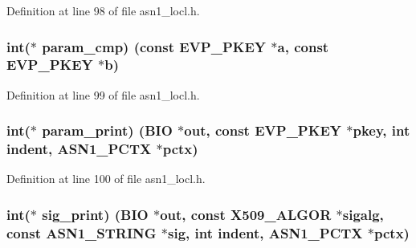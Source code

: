 Definition at line 98 of file asn1\+\_\+locl.\+h.

\subsubsection[{\texorpdfstring{param\+\_\+cmp}{param_cmp}}]{\setlength{\rightskip}{0pt plus 5cm}int($\ast$ param\+\_\+cmp) (const {\bf E\+V\+P\+\_\+\+P\+K\+EY} $\ast${\bf a}, const {\bf E\+V\+P\+\_\+\+P\+K\+EY} $\ast$b)}\hypertarget{structevp__pkey__asn1__method__st_afb0d67cb976c540f70d7ee6d24e54b82}{}\label{structevp__pkey__asn1__method__st_afb0d67cb976c540f70d7ee6d24e54b82}


Definition at line 99 of file asn1\+\_\+locl.\+h.

\subsubsection[{\texorpdfstring{param\+\_\+print}{param_print}}]{\setlength{\rightskip}{0pt plus 5cm}int($\ast$ param\+\_\+print) ({\bf B\+IO} $\ast$out, const {\bf E\+V\+P\+\_\+\+P\+K\+EY} $\ast$pkey, int indent, {\bf A\+S\+N1\+\_\+\+P\+C\+TX} $\ast$pctx)}\hypertarget{structevp__pkey__asn1__method__st_a0ff2b13dc240bd034bdcf6007f940766}{}\label{structevp__pkey__asn1__method__st_a0ff2b13dc240bd034bdcf6007f940766}


Definition at line 100 of file asn1\+\_\+locl.\+h.

\subsubsection[{\texorpdfstring{sig\+\_\+print}{sig_print}}]{\setlength{\rightskip}{0pt plus 5cm}int($\ast$ sig\+\_\+print) ({\bf B\+IO} $\ast$out, const {\bf X509\+\_\+\+A\+L\+G\+OR} $\ast$sigalg, const {\bf A\+S\+N1\+\_\+\+S\+T\+R\+I\+NG} $\ast$sig, int indent, {\bf A\+S\+N1\+\_\+\+P\+C\+TX} $\ast$pctx)}\hypertarget{structevp__pkey__asn1__method__st_aa9d4f52318bd234d46593ac9aa996bcf}{}\label{structevp__pkey__asn1__method__st_aa9d4f52318bd234d46593ac9aa996bcf}


